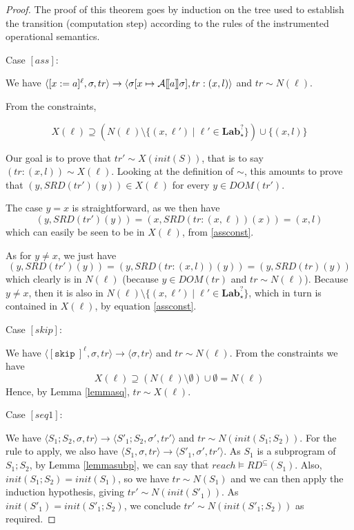 \documentclass[a4wide,12pt]{article}
\theoremstyle{definition}
\theoremstyle{plain}
\theoremstyle{remark}
\def\A#1{\mathcal{A}[\hspace{-1pt}[#1]\hspace{-1pt}]}
\def\const#1{\mathopen{\langle}#1\mathclose{\rangle}} %
\def\pair#1{\const{#1}}
\def\Lab {\mathbf{Lab}}
\def\skip {\texttt{skip}\ }
\begin{document}
\begin{proof}
The proof of this theorem goes by induction on the tree used to establish
the transition (computation step) according to the rules of the instrumented operational semantics.

Case $[ass]$:

We have $\pair{[x := a]^\ell, \sigma, tr} \to \pair{\sigma[x\mapsto\A{a}\sigma], tr:(x,l)}$
and $tr \sim N(\ell)$. 


From the constraints,

\begin{equation}\label{assconst}
X(\ell) \supseteq (N(\ell) \setminus \{(x,\ell') \mid \ell' \in \Lab_\star^?\}) \cup \{(x,l)\}
\end{equation}

Our goal is to prove that $tr' \sim X(init(S))$, that is to say $(tr:(x,l)) \sim X(\ell)$.
Looking at the definition of $\sim$,
this amounts to prove that $(y,SRD(tr')(y)) \in X(\ell)$ for every $y \in DOM(tr')$.

The case $y=x$ is straightforward, as
we then have \[(y,SRD(tr')(y)) = (x,SRD(tr:(x,\ell))(x)) = (x,l)\] which can easily be seen to be in $X(\ell)$, from \ref{assconst}.

As for $y\neq x$, we just have \[(y,SRD(tr')(y)) = (y,SRD(tr:(x,l))(y)) = (y,SRD(tr)(y))\] which clearly is in $N(\ell)$ (because $y \in DOM(tr)$ and $tr \sim N(\ell)$).
Because $y\neq x$, then it is also in $N(\ell) \setminus \{(x,\ell') \mid \ell' \in \Lab_\star^?\}$, which in turn is contained in $X(\ell)$, by equation \ref{assconst}.


Case $[skip]$:

We have $\pair{[\skip]^\ell, \sigma, tr} \to \pair{\sigma, tr}$
and $tr \sim N(\ell)$. 
From the constraints we have
\[X(\ell) \supseteq (N(\ell) \setminus \emptyset) \cup \emptyset = N(\ell)\]
Hence, by Lemma \ref{lemmasq}, $tr \sim X(\ell)$.

Case $[seq1]$:

We have $\pair{S_1;S_2,\sigma,tr} \to \pair{S'_1;S_2,\sigma',tr'}$ and $tr \sim N(init(S_1;S_2))$.
For the rule to apply, we also have $\pair{S_1,\sigma,tr} \to \pair{S'_1,\sigma',tr'}$.
As $S_1$ is a subprogram of $S_1;S_2$, by Lemma \ref{lemmasubp},
we can say that $reach \models RD^{\subseteq}(S_1)$. Also, $init(S_1;S_2) = init(S_1)$, so we have
$tr \sim N(S_1)$ and we can then apply the induction hypothesis, giving $tr' \sim  N(init(S'_1))$.
As $init(S'_1) = init(S'_1;S_2)$, we conclude $tr' \sim N(init(S'_1;S_2))$ as required.


\end{proof}
\end{document}
